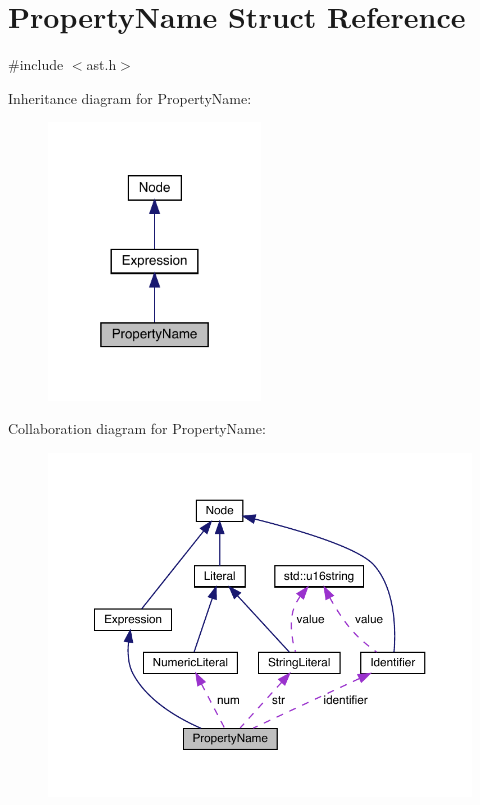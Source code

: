 \hypertarget{struct_property_name}{}\section{Property\+Name Struct Reference}
\label{struct_property_name}


{\ttfamily \#include $<$ast.\+h$>$}



Inheritance diagram for Property\+Name\+:\nopagebreak
\begin{figure}[H]
\begin{center}
\leavevmode
\includegraphics[width=160pt]{struct_property_name__inherit__graph}
\end{center}
\end{figure}


Collaboration diagram for Property\+Name\+:
\nopagebreak
\begin{figure}[H]
\begin{center}
\leavevmode
\includegraphics[width=350pt]{struct_property_name__coll__graph}
\end{center}
\end{figure}
